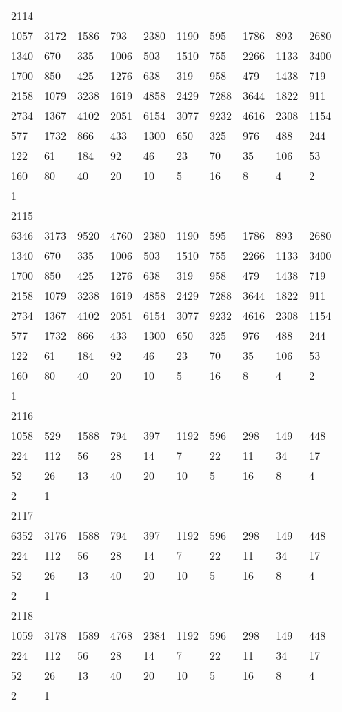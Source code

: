 \begin{longtable}{*{10}{l}}
2114&&&&&&&&&\\
1057& 3172& 1586& 793& 2380& 1190& 595& 1786& 893& 2680\\
1340& 670& 335& 1006& 503& 1510& 755& 2266& 1133& 3400\\
1700& 850& 425& 1276& 638& 319& 958& 479& 1438& 719\\
2158& 1079& 3238& 1619& 4858& 2429& 7288& 3644& 1822& 911\\
2734& 1367& 4102& 2051& 6154& 3077& 9232& 4616& 2308& 1154\\
577& 1732& 866& 433& 1300& 650& 325& 976& 488& 244\\
122& 61& 184& 92& 46& 23& 70& 35& 106& 53\\
160& 80& 40& 20& 10& 5& 16& 8& 4& 2\\
1& \\

2115&&&&&&&&&\\
6346& 3173& 9520& 4760& 2380& 1190& 595& 1786& 893& 2680\\
1340& 670& 335& 1006& 503& 1510& 755& 2266& 1133& 3400\\
1700& 850& 425& 1276& 638& 319& 958& 479& 1438& 719\\
2158& 1079& 3238& 1619& 4858& 2429& 7288& 3644& 1822& 911\\
2734& 1367& 4102& 2051& 6154& 3077& 9232& 4616& 2308& 1154\\
577& 1732& 866& 433& 1300& 650& 325& 976& 488& 244\\
122& 61& 184& 92& 46& 23& 70& 35& 106& 53\\
160& 80& 40& 20& 10& 5& 16& 8& 4& 2\\
1& \\

2116&&&&&&&&&\\
1058& 529& 1588& 794& 397& 1192& 596& 298& 149& 448\\
224& 112& 56& 28& 14& 7& 22& 11& 34& 17\\
52& 26& 13& 40& 20& 10& 5& 16& 8& 4\\
2& 1& \\

2117&&&&&&&&&\\
6352& 3176& 1588& 794& 397& 1192& 596& 298& 149& 448\\
224& 112& 56& 28& 14& 7& 22& 11& 34& 17\\
52& 26& 13& 40& 20& 10& 5& 16& 8& 4\\
2& 1& \\

2118&&&&&&&&&\\
1059& 3178& 1589& 4768& 2384& 1192& 596& 298& 149& 448\\
224& 112& 56& 28& 14& 7& 22& 11& 34& 17\\
52& 26& 13& 40& 20& 10& 5& 16& 8& 4\\
2& 1& \\


\end{longtable}
